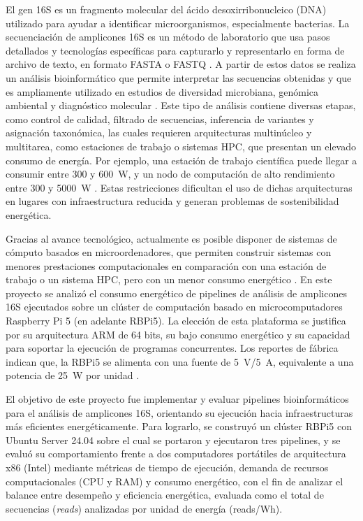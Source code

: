 \documentclass[12pt,oneside,spanish]{book}
\begin{document}
    El gen 16S es un fragmento molecular del ácido desoxirribonucleico (DNA) utilizado para ayudar a identificar microorganismos, especialmente bacterias. La secuenciación de amplicones 16S es un método de laboratorio que usa pasos detallados y tecnologías específicas para capturarlo y representarlo en forma de archivo de texto, en formato FASTA o FASTQ \citep{cock2010fastq}. A partir de estos datos se realiza un análisis bioinformático que permite interpretar las secuencias obtenidas y que es ampliamente utilizado en estudios de diversidad microbiana, genómica ambiental y diagnóstico molecular \citep{clarridge2004}. Este tipo de análisis contiene diversas etapas, como control de calidad, filtrado de secuencias, inferencia de variantes y asignación taxonómica, las cuales requieren arquitecturas multinúcleo y multitarea, como estaciones de trabajo o sistemas HPC, que presentan un elevado consumo de energía. Por ejemplo, una estación de trabajo científica puede llegar a consumir entre 300 y 600~W, y un nodo de computación de alto rendimiento entre 300 y 5000~W \citep{cox2014iridis}. Estas restricciones dificultan el uso de dichas arquitecturas en lugares con infraestructura reducida y generan problemas de sostenibilidad energética.
    
    Gracias al avance tecnológico, actualmente es posible disponer de sistemas de cómputo basados en microordenadores, que permiten construir sistemas con menores prestaciones computacionales en comparación con una estación de trabajo o un sistema HPC, pero con un menor consumo energético \citep{pyrhonen2025energy}. En este proyecto se analizó el consumo energético de pipelines de análisis de amplicones 16S ejecutados sobre un clúster de computación basado en microcomputadores Raspberry Pi 5 (en adelante RBPi5). La elección de esta plataforma se justifica por su arquitectura ARM de 64 bits, su bajo consumo energético y su capacidad para soportar la ejecución de programas concurrentes. Los reportes de fábrica indican que, la RBPi5 se alimenta con una fuente de 5~V/5~A, equivalente a una potencia de 25~W por unidad \citep{rpi2023brief}.
    \newpage
    
    El objetivo de este proyecto fue implementar y evaluar pipelines bioinformáticos para el análisis de amplicones 16S, orientando su ejecución hacia infraestructuras más eficientes energéticamente. Para lograrlo, se construyó un clúster RBPi5 con Ubuntu Server 24.04 sobre el cual se portaron y ejecutaron tres pipelines, y se evaluó su comportamiento frente a dos computadores portátiles de arquitectura x86 (Intel) mediante métricas de tiempo de ejecución, demanda de recursos computacionales (CPU y RAM) y consumo energético, con el fin de analizar el balance entre desempeño y eficiencia energética, evaluada como el total de secuencias (\textit{reads}) analizadas por unidad de energía (reads/Wh).
    
\end{document}
